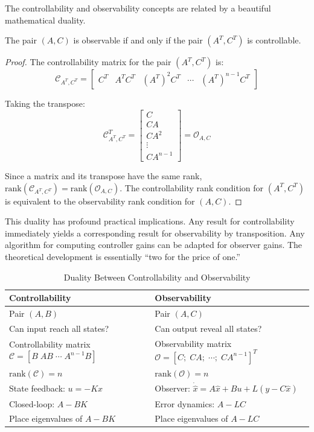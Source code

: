 The controllability and observability concepts are related by a beautiful mathematical duality.

\begin{theorem}
The pair $(A, C)$ is observable if and only if the pair $(A^T, C^T)$ is controllable.
\end{theorem}

\begin{proof}
The controllability matrix for the pair $(A^T, C^T)$ is:
\begin{equation}
\mathcal{C}_{A^T, C^T} = \begin{bmatrix}
C^T & A^TC^T & (A^T)^2C^T & \cdots & (A^T)^{n-1}C^T
\end{bmatrix}
\end{equation}

Taking the transpose:
\begin{equation}
\mathcal{C}_{A^T, C^T}^T = \begin{bmatrix}
C \\ CA \\ CA^2 \\ \vdots \\ CA^{n-1}
\end{bmatrix} = \mathcal{O}_{A,C}
\end{equation}

Since a matrix and its transpose have the same rank, $\text{rank}(\mathcal{C}_{A^T, C^T}) = \text{rank}(\mathcal{O}_{A,C})$. The controllability rank condition for $(A^T, C^T)$ is equivalent to the observability rank condition for $(A, C)$.
\end{proof}

This duality has profound practical implications. Any result for controllability immediately yields a corresponding result for observability by transposition. Any algorithm for computing controller gains can be adapted for observer gains. The theoretical development is essentially ``two for the price of one.''

\begin{table}[ht]
\centering
\caption{Duality Between Controllability and Observability}
\label{tab:duality}
\begin{tabular}{@{}ll@{}}
\toprule
\textbf{Controllability} & \textbf{Observability} \\
\midrule
Pair $(A, B)$ & Pair $(A, C)$ \\
Can input reach all states? & Can output reveal all states? \\
Controllability matrix $\mathcal{C} = [B\; AB\; \cdots\; A^{n-1}B]$ & Observability matrix $\mathcal{O} = [C;\; CA;\; \cdots;\; CA^{n-1}]^T$ \\
$\text{rank}(\mathcal{C}) = n$ & $\text{rank}(\mathcal{O}) = n$ \\
State feedback: $u = -Kx$ & Observer: $\dot{\hat{x}} = A\hat{x} + Bu + L(y-C\hat{x})$ \\
Closed-loop: $A - BK$ & Error dynamics: $A - LC$ \\
Place eigenvalues of $A-BK$ & Place eigenvalues of $A-LC$ \\
\bottomrule
\end{tabular}
\end{table}

